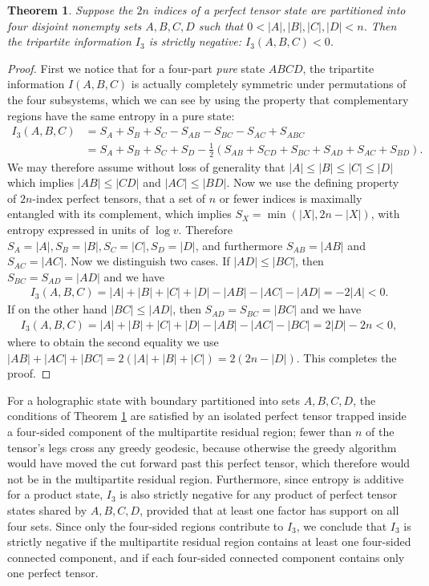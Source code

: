 \documentclass[12pt]{article}
\theoremstyle{plain}
\newtheorem{theorem}{Theorem}
\theoremstyle{plain}
\theoremstyle{plain}
\theoremstyle{plain}
\theoremstyle{result}
\theoremstyle{remark}
\theoremstyle{conjecture}
\theoremstyle{observation}
\theoremstyle{definition}
\theoremstyle{corollary}
\theoremstyle{definition}
\theoremstyle{definition}
\theoremstyle{assumption}
\theoremstyle{definition}
\theoremstyle{problem}
\theoremstyle{fact}
\begin{document}
\begin{theorem}\label{lem:negativeTripartiteInformation}
Suppose the $2n$ indices of a perfect tensor state are partitioned into four disjoint nonempty sets $A,B,C,D$ such that $0 < |A|,|B|,|C|,|D| < n$. Then the tripartite information $I_3$ is strictly negative: $I_3(A,B,C) < 0$.
\end{theorem}
\begin{proof}
First we notice that for a four-part \textit{pure} state $ABCD$, the tripartite information $I(A,B,C)$ is actually completely symmetric under permutations of the four subsystems, which we can see by using the property that complementary regions have the same entropy in a pure state:
\begin{align}
I_3(A,B,C) & = S_A + S_B + S_C - S_{AB} - S_{BC} -S_{AC} + S_{ABC}\\
            & = S_A + S_B + S_C + S_D-\frac{1}{2}( S_{AB} + S_{CD} + S_{BC} + S_{AD} + S_{AC} +S_{BD} ).
\end{align}
We may therefore assume without loss of generality that $|A| \leq |B| \leq |C| \leq |D|$ which implies $|AB| \leq |CD|$ and $|AC| \leq |BD|$. Now we use the defining property of $2n$-index perfect tensors, that a set of $n$ or fewer indices is maximally entangled with its complement, which implies $S_X = \min(|X|, 2n-|X|)$, with entropy expressed in units of $\log v$. Therefore $S_A=|A|, S_B=|B|, S_C=|C|,S_D=|D|$, and furthermore $S_{AB} = |AB|$ and $S_{AC} = |AC|$. Now we distinguish two cases.
If $|AD| \leq |BC|$, then $S_{BC} = S_{AD}= |AD|$ and we have
\begin{align}
I_3(A,B,C) = |A| + |B| + |C| +|D| - |AB| - |AC| - |AD| = -2|A| < 0.
\end{align}
If on the other hand $|BC| \leq |AD|$, then $S_{AD} = S_{BC} = |BC|$ and we have
\begin{align}
I_3(A,B,C) = |A| + |B| + |C| +|D| - |AB| - |AC| - |BC| = 2|D| - 2n < 0,
\end{align}
where to obtain the second equality we use $|AB| + |AC| + |BC| = 2(|A| + |B| + |C|) = 2(2n-|D|)$. This completes the proof.
\end{proof}

For a holographic state with boundary partitioned into sets $A,B,C,D$, the conditions of Theorem \ref{lem:negativeTripartiteInformation} are satisfied by an isolated perfect tensor trapped inside a four-sided component of the multipartite residual region; fewer than $n$ of the tensor's legs cross any greedy geodesic, because otherwise the greedy algorithm would have moved the cut forward past this perfect tensor, which therefore would not be in the multipartite residual region. Furthermore, since entropy is additive for a product state, $I_3$ is also strictly negative for any product of perfect tensor states shared by $A,B,C,D$, provided that at least one factor has support on all four sets. Since only the four-sided regions contribute to $I_3$, we conclude that $I_3$ is strictly negative if the multipartite residual region contains at least one four-sided connected component, and if  each four-sided connected component contains only one perfect tensor.
\end{document}
